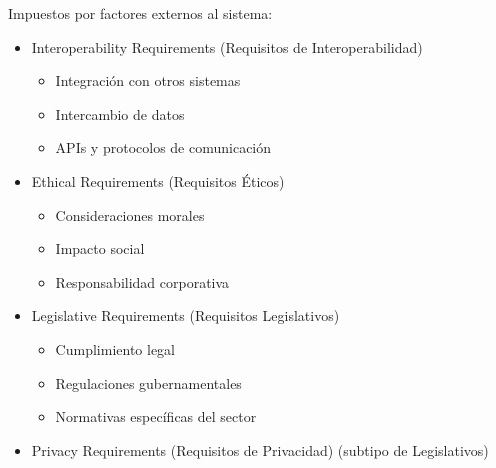     Impuestos por factores externos al sistema:


    \begin{itemize}

        \item Interoperability Requirements (Requisitos de Interoperabilidad)
        \begin{itemize}

            \item Integración con otros sistemas

            \item Intercambio de datos

            \item APIs y protocolos de comunicación

        \end{itemize}



        \item Ethical Requirements (Requisitos Éticos)
        \begin{itemize}

            \item Consideraciones morales

            \item Impacto social

            \item Responsabilidad corporativa

        \end{itemize}



        \item Legislative Requirements (Requisitos Legislativos)
        \begin{itemize}

            \item Cumplimiento legal

            \item Regulaciones gubernamentales

            \item Normativas específicas del sector

        \end{itemize}



        \item Privacy Requirements (Requisitos de Privacidad) (subtipo de Legislativos)
        \begin{itemize}


\end{itemize}
\end{itemize}
